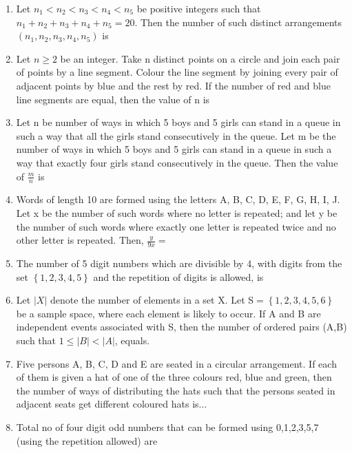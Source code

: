 \documentclass[journal,12pt,twocolumn]{IEEEtran}
\begin{document}
\begin{enumerate}
\item Let $n_1<n_2<n_3<n_4<n_5$ be positive integers such that $n_1+n_2+n_3+n_4+n_5=20.$ Then the number of such distinct arrangements $(n_1,n_2,n_3,n_4,n_5)$ is\\
\item Let $n\geq2$ be an integer. Take n distinct points on a circle and join each pair of points by a line segment. Colour the line segment by joining every pair of adjacent points by blue and the rest by red. If the number of red and blue line segments are equal, then the value of n is\\
\item Let n be number of ways in which 5 boys and 5 girls can stand in a queue in such a way that all the girls stand consecutively in the queue. Let m be the number of ways in which 5 boys and 5 girls can stand in a queue in such a way that exactly four girls stand consecutively in the queue. Then the value of $\frac{m}{n}$ is\\
\item Words of length 10 are formed using the letters A, B, C, D, E, F, G, H, I, J. Let x be the number of such words where no letter is repeated; and let y be the number of such words where exactly one letter is repeated twice and no other letter is repeated. Then, $\frac{y}{9x} = $\\
\item The number of 5 digit numbers which are divisible by 4, with digits from the set $\left\lbrace1,2,3,4,5\right\rbrace$ and the repetition of digits is allowed, is\\
\item Let $\vert X \vert$ denote the number of elements in a set X. Let S$=\left\lbrace1,2,3,4,5,6\right\rbrace$ be a sample space, where each element is likely to occur. If A and B are independent events associated with S, then the number of ordered pairs (A,B) such that $1\leq\vert B \vert < \vert A \vert$, equals.\\
\item Five persons A, B, C, D and E are seated in a circular arrangement. If each of them is given a hat of one of the three colours red, blue and green, then the number of ways of distributing the hats such that the persons seated in adjacent seats get different coloured hats is...\\ 
\item Total no of four digit odd numbers that can be formed using 0,1,2,3,5,7 (using the repetition allowed) are
\begin{enumerate}

\end{enumerate}
\end{enumerate}
\end{document}
